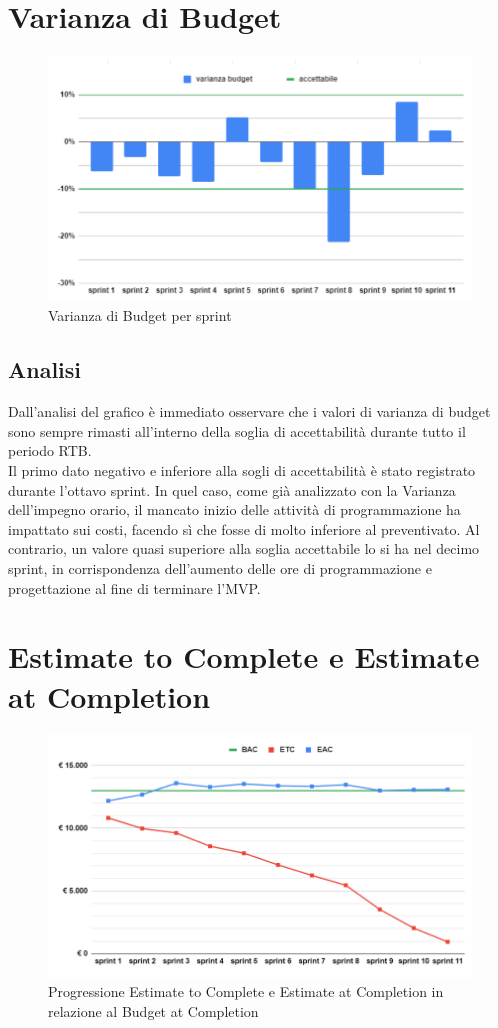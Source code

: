 \section{Varianza di Budget}
\begin{figure}[H]
    \centering
    \includegraphics[width=0.8\linewidth]{VarBud.png}
    \caption{Varianza di Budget per sprint}
\end{figure}
\subsection{Analisi}
Dall'analisi del grafico è immediato osservare che i valori di varianza di budget sono sempre rimasti all'interno della soglia di accettabilità durante tutto il periodo RTB.\\
Il primo dato negativo e inferiore alla sogli di accettabilità è stato registrato durante l'ottavo sprint. In quel caso, come già analizzato con la Varianza dell'impegno orario, il mancato inizio delle attività di programmazione ha impattato sui costi, facendo sì che fosse di molto inferiore al preventivato.
Al contrario, un valore quasi superiore alla soglia accettabile lo si ha nel decimo sprint, in corrispondenza dell'aumento delle ore di programmazione e progettazione al fine di terminare l'MVP.

\section{Estimate to Complete e Estimate at Completion}
\begin{figure}[H]
    \centering
    \includegraphics[width=0.8\linewidth]{ETCEAC.png}
    \caption{Progressione Estimate to Complete e Estimate at Completion in relazione al Budget at Completion}
\end{figure}
